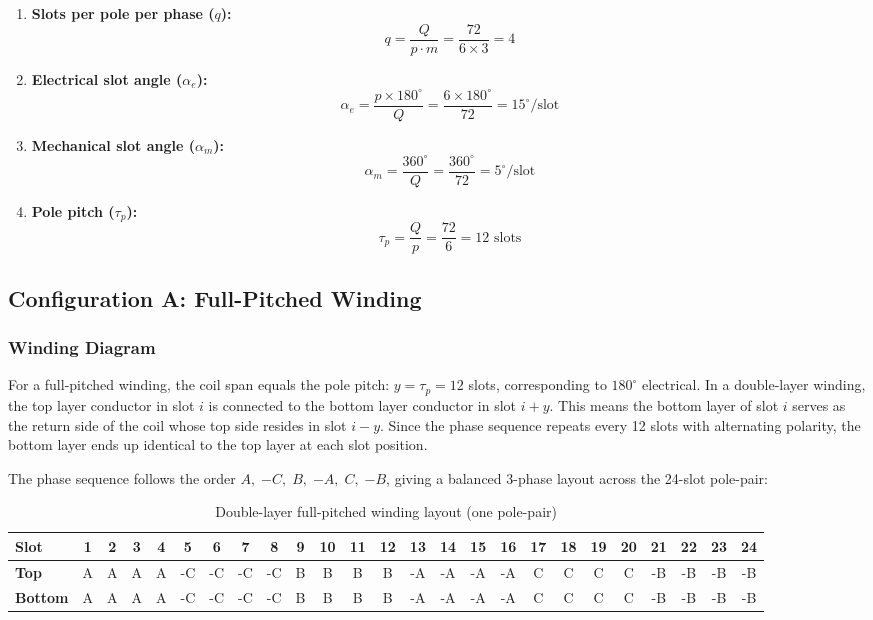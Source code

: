 \documentclass[12pt, a4paper]{article}
\begin{document}
\begin{enumerate}
    \item \textbf{Slots per pole per phase ($q$):}
    \[ q = \frac{Q}{p \cdot m} = \frac{72}{6 \times 3} = 4\]

    \item \textbf{Electrical slot angle ($\alpha_e$):}
    \[\alpha_e = \frac{p \times 180^\circ}{Q} = \frac{6 \times 180^\circ}{72} = 15^\circ/\text{slot}\]

    \item \textbf{Mechanical slot angle ($\alpha_m$):}
    \[\alpha_m = \frac{360^\circ}{Q} = \frac{360^\circ}{72} = 5^\circ/\text{slot}\]

    \item \textbf{Pole pitch ($\tau_p$):}
    \[\tau_p = \frac{Q}{p} = \frac{72}{6} = 12 \text{ slots}\]
\end{enumerate}


\subsection{Configuration A: Full-Pitched Winding}

\subsubsection{Winding Diagram}

For a full-pitched winding, the coil span equals the pole pitch: $y = \tau_p = 12$ slots, corresponding to $180^\circ$ electrical. In a double-layer winding, the top layer conductor in slot $i$ is connected to the bottom layer conductor in slot $i + y$. This means the bottom layer of slot $i$ serves as the return side of the coil whose top side resides in slot $i - y$. Since the phase sequence repeats every 12 slots with alternating polarity, the bottom layer ends up identical to the top layer at each slot position.

The phase sequence follows the order $A,\; {-C},\; B,\; {-A},\; C,\; {-B}$, giving a balanced 3-phase layout across the 24-slot pole-pair:

\begin{table}[ht!]
\centering
\footnotesize
\setlength{\tabcolsep}{2.5pt}
\caption{Double-layer full-pitched winding layout (one pole-pair)}
\begin{tabular}{l|cccc|cccc|cccc|cccc|cccc|cccc}
\toprule
\textbf{Slot} & 1 & 2 & 3 & 4 & 5 & 6 & 7 & 8 & 9 & 10 & 11 & 12 & 13 & 14 & 15 & 16 & 17 & 18 & 19 & 20 & 21 & 22 & 23 & 24 \\
\midrule
\textbf{Top} & A & A & A & A & -C & -C & -C & -C & B & B & B & B & -A & -A & -A  & -A  & C & C & C & C & -B & -B & -B & -B \\
\textbf{Bottom} & A & A & A & A & -C & -C & -C & -C & B & B & B & B & -A & -A & -A  & -A  & C & C & C & C & -B & -B & -B & -B \\
\bottomrule
\end{tabular}
\end{table}
\end{document}
